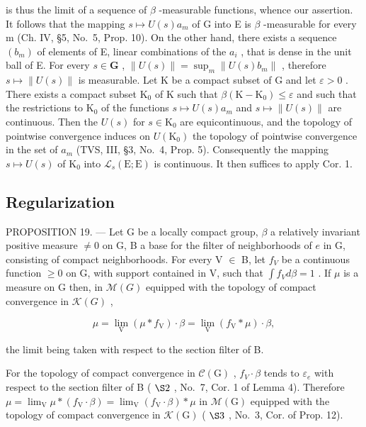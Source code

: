 is thus the limit of a sequence of \(\beta\) -measurable functions, whence our assertion. It follows that the mapping \(s \mapsto U(s)a_{m}\) of G into E is \(\beta\) -measurable for every m (Ch. IV, §5, No.~5, Prop. 10). On the other hand, there exists a sequence \((b_{m})\) of elements of E, linear combinations of the \(a_{i}\) , that is dense in the unit ball of E. For every \(s \in \mathbf{G}\) , \(\|U(s)\| = \sup_{m} \|U(s)b_{m}\|\) , therefore \(s \mapsto \|U(s)\|\) is measurable. Let K be a compact subset of G and let \(\varepsilon > 0\) . There exists a compact subset \(\mathrm{K}_{0}\) of K such that \(\beta(\mathrm{K} - \mathrm{K}_{0}) \leqslant \varepsilon\) and such that the restrictions to \(\mathrm{K}_{0}\) of the functions \(s \mapsto U(s)a_{m}\) and \(s \mapsto \|U(s)\|\) are continuous. Then the \(U(s)\) for \(s \in \mathrm{K}_{0}\) are equicontinuous, and the topology of pointwise convergence induces on \(U(\mathrm{K}_{0})\) the topology of pointwise convergence in the set of \(a_{m}\) (TVS, III, §3, No.~4, Prop. 5). Consequently the mapping \(s \mapsto U(s)\) of \(\mathrm{K}_{0}\) into \(\mathcal{L}_{s}(\mathrm{E};\mathrm{E})\) is continuous. It then suffices to apply Cor. 1.

\subsection{Regularization}

PROPOSITION 19. --- Let G be a locally compact group, \(\beta\) a relatively invariant positive measure \(\neq 0\) on G, B a base for the filter of neighborhoods of \(e\) in G, consisting of compact neighborhoods. For every V \(\in\) B, let \(f_{V}\) be a continuous function \(\geqslant 0\) on G, with support contained in V, such that \(\int f_{V} d\beta = 1\) . If \(\mu\) is a measure on G then, in \(\mathcal{M}(G)\) equipped with the topology of compact convergence in \(\mathcal{K}(G)\) ,

\[
\mu = \lim _ {\mathrm{V}} (\mu * f _ {\mathrm{V}}) \cdot \beta = \lim _ {\mathrm{V}} (f _ {\mathrm{V}} * \mu) \cdot \beta ,
\]

the limit being taken with respect to the section filter of B.

For the topology of compact convergence in \(\mathcal{C}(\mathrm{G})\) , \(f_{V} \cdot \beta\) tends to \(\varepsilon_{e}\) with respect to the section filter of B ( \(\S2\) , No.~7, Cor. 1 of Lemma 4). Therefore \(\mu = \lim_{\mathrm{V}} \mu * (f_{\mathrm{V}} \cdot \beta) = \lim_{\mathrm{V}} (f_{\mathrm{V}} \cdot \beta) * \mu\) in \(\mathcal{M}(\mathrm{G})\) equipped with the topology of compact convergence in \(\mathcal{K}(\mathrm{G})\) ( \(\S3\) , No.~3, Cor. of Prop. 12).

